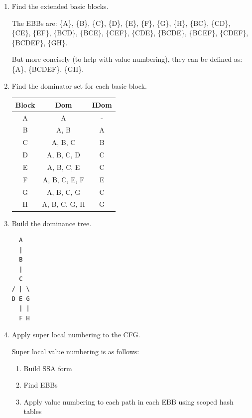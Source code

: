 \documentclass[11pt]{article}
\begin{document}
\begin{enumerate}
	\item Find the extended basic blocks.
		\begin{Answer}
		The EBBs are:
		\{A\}, \{B\}, \{C\}, \{D\}, \{E\}, \{F\}, \{G\}, \{H\}, \{BC\}, \{CD\}, \{CE\}, \{EF\}, \{BCD\}, \{BCE\}, \{CEF\}, \{CDE\}, \{BCDE\}, \{BCEF\}, \{CDEF\}, \{BCDEF\}, \{GH\}.
		
		But more concisely (to help with value numbering), they can be defined as: \{A\}, \{BCDEF\}, \{GH\}.
		\end{Answer}
	\item Find the dominator set for each basic block.
		\begin{Answer}
			\begin{center}
			\begin{tabular}{ |c|c|c| }
			\hline
			Block & Dom & IDom \\ [0.5ex] %
			\hline
			A & A & - \\ 
			B & A, B & A \\ 
			C & A, B, C & B \\ 
			D & A, B, C, D & C \\ 
			E & A, B, C, E & C \\ 
			F & A, B, C, E, F & E \\ 
			G & A, B, C, G & C \\ 
			H & A, B, C, G, H & G \\ 
			\hline
			\end{tabular}
			\end{center}
		\end{Answer}		
	\item Build the dominance tree.
		\begin{Answer}
\begin{verbatim}
  A
  |
  B
  |
  C
/ | \
D E G
  | |
  F H
\end{verbatim}
		\end{Answer}
	\item Apply super local numbering to the CFG.
		\begin{Answer}
		Super local value numbering is as follows:
		\begin{enumerate}[i]
			\item Build SSA form
			\item Find EBBs
			\item Apply value numbering to each path in each EBB using scoped hash tables
		\end{enumerate}
		

\end{Answer}
\end{enumerate}
\end{document}
